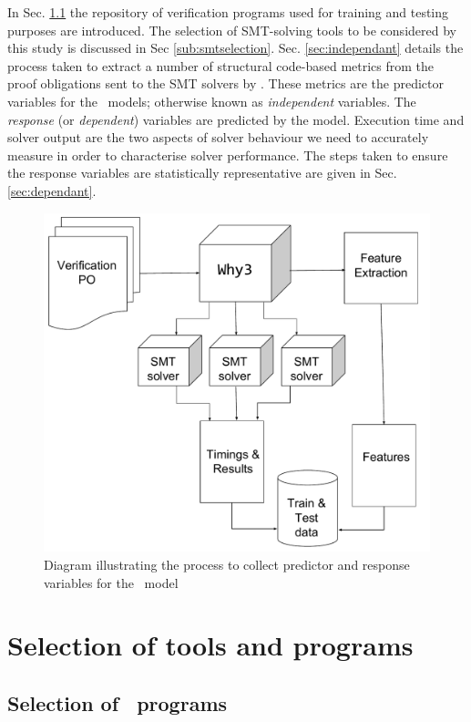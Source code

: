 In Sec. \ref{sub:why3programs} the repository of verification programs used for training and testing purposes are introduced. 
The selection of SMT-solving tools to be considered by this study is discussed in Sec \ref{sub:smtselection}.  
Sec. \ref{sec:independant} details the process taken to extract a number of structural code-based metrics from the proof obligations sent to the SMT solvers by \why. 
These metrics are the predictor variables for the \where~models; otherwise known as \textit{independent} variables. 
The \textit{response} (or \textit{dependent}) variables are predicted by the model. Execution time and solver output are the two aspects of solver behaviour we need to  accurately measure in order to characterise solver performance. 
The steps taken to ensure the response variables are statistically representative are given in Sec. \ref{sec:dependant}. 

\begin{figure}
\centering
\includegraphics[width=0.9\linewidth]{Figures/Chapter3}
\caption{Diagram illustrating the process to collect predictor and response variables for the \where~model}
\label{fig:Chapter3}
\end{figure}

\section{Selection of tools and programs}
\label{sec:selection}

\subsection{Selection of \why~programs}
\label{sub:why3programs}

